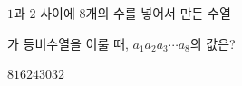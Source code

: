 $1$과 $2$ 사이에 $8$개의 수를 넣어서 만든 수열 \par\smallskip{}\par\smallskip\noindent 가 등비수열을 이룰 때, $a_1a_2a_3\cdots a_8$의 값은?
\begin{choices32}{$8$}{$16$}{$24$}{$30$}{$32$}\end{choices32}
